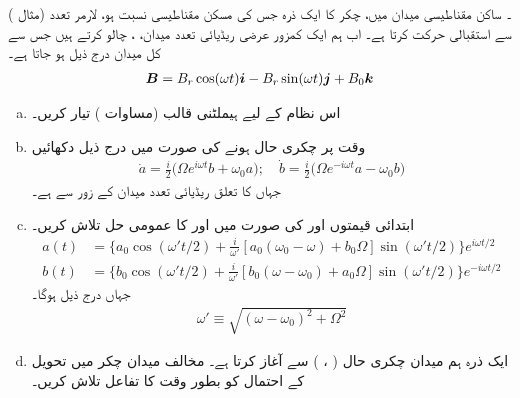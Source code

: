۔ ساکن مقناطیسی میدان  میں،  چکر کا ایک ذرہ جس کی مسکن مقناطیسی نسبت  ہو، لارمر تعدد  (مثال ) سے استقبالی حرکت کرتا ہے۔ اب ہم ایک کمزور عرضی ریڈیائی تعدد میدان، ، چالو کرتے ہیں جس سے کل میدان درج ذیل ہو جاتا ہے۔
\begin{align}
	{\ensuremath{{\boldsymbol{B}}}} = B_{r}\cos(\omega t){\boldsymbol{i}} - B_{r}\sin(\omega t){\boldsymbol{j}} + B_0{\boldsymbol{k}}
\end{align} 
\begin{enumerate}[a.]
\item
اس نظام کے لیے  ہیملٹنی قالب (مساوات ) تیار کریں۔
\item
 وقت  پر چکری حال  ہونے کی صورت میں درج ذیل دکھائیں
\begin{align}
	\dot{a} = \frac{i}{2}\big(\Omega e^{i\omega t}b+\omega_0 a\big); \quad\dot{b} = \frac{i}{2}\big(\Omega e^{-i\omega t}a-\omega_0 b\big)
\end{align}
جہاں  کا تعلق ریڈیائی تعدد میدان کے زور سے ہے۔
\item
 ابتدائی قیمتوں  اور  کی صورت میں  اور  کا عمومی حل تلاش کریں۔  
\begin{align*}
	a(t) &= \bigg\{a_0\cos(\omega't/2)+\frac{i}{\omega'}[a_0(\omega_0-\omega)+b_0\Omega]\sin(\omega't/2)\bigg\}e^{i\omega t/2} \\
	b(t) &= \bigg\{b_0\cos(\omega't/2)+\frac{i}{\omega'}[b_0(\omega-\omega_0)+a_0\Omega]\sin(\omega't/2)\bigg\}e^{-i\omega t/2} 
\end{align*}
جہاں درج ذیل ہوگا۔
\begin{align}
	\omega'\equiv\sqrt{(\omega-\omega_0)^2+\Omega^2}
\end{align}
\item
 ایک ذرہ ہم میدان چکری حال ( ، ) سے آغاز کرتا ہے۔ مخالف میدان چکر میں تحویل کے احتمال کو بطور وقت کا تفاعل تلاش کریں۔


\end{enumerate}
